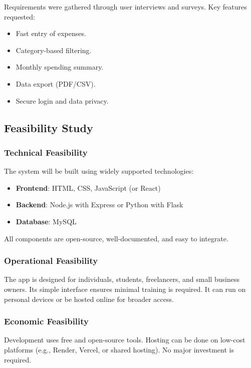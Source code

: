 \documentclass[a4paper,12pt]{article}
\begin{document}
Requirements were gathered through user interviews and surveys. Key features requested:

\begin{itemize}
    \item Fast entry of expenses.
    \item Category-based filtering.
    \item Monthly spending summary.
    \item Data export (PDF/CSV).
    \item Secure login and data privacy.
\end{itemize}

\subsection{Feasibility Study}

\subsubsection{Technical Feasibility}

The system will be built using widely supported technologies:

\begin{itemize}
    \item \textbf{Frontend}: HTML, CSS, JavaScript (or React)
    \item \textbf{Backend}: Node.js with Express or Python with Flask
    \item \textbf{Database}: MySQL
\end{itemize}

All components are open-source, well-documented, and easy to integrate.

\subsubsection{Operational Feasibility}

The app is designed for individuals, students, freelancers, and small business owners. Its simple interface ensures minimal training is required. It can run on personal devices or be hosted online for broader access.

\subsubsection{Economic Feasibility}

Development uses free and open-source tools. Hosting can be done on low-cost platforms (e.g., Render, Vercel, or shared hosting). No major investment is required.
\end{document}
